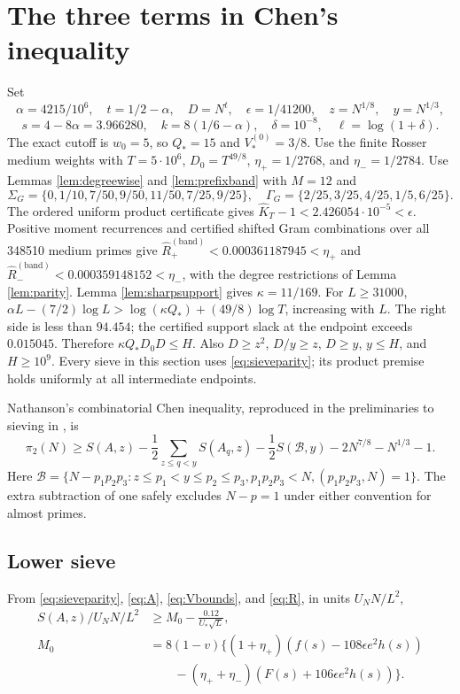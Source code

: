 \documentclass[11pt]{article}
\newcommand{\Th}{U_NN/L^2}
\begin{document}
\section{The three terms in Chen's inequality}
Set
\[
\alpha=4215/10^6,\quad t=1/2-\alpha,\quad D=N^t,\quad
\epsilon=1/41200,\quad z=N^{1/8},\quad y=N^{1/3},
\]
\[
s=4-8\alpha=3.966280,\quad k=8(1/6-\alpha),\quad
\delta=10^{-8},\quad \ell=\log(1+\delta).
\]
The exact cutoff is $w_0=5$, so $Q_*=15$ and
$V_*^{(0)}=3/8$. Use the finite Rosser medium weights with
$T=5\cdot10^6$, $D_0=T^{49/8}$,
$\eta_+=1/2768$, and $\eta_-=1/2784$.
Use Lemmas \ref{lem:degreewise} and \ref{lem:prefixband} with $M=12$ and
\[
\Sigma_G=\{0,1/10,7/50,9/50,11/50,7/25,9/25\},\quad
\Gamma_G=\{2/25,3/25,4/25,1/5,6/25\}.
\]
The ordered uniform product certificate gives
$\widehat K_T-1<2.426054\cdot10^{-5}<\epsilon$. Positive moment
recurrences and certified shifted Gram combinations over all 348510
medium primes give
$\widehat R^{(\mathrm{band})}_+<0.000361187945<\eta_+$ and
$\widehat R^{(\mathrm{band})}_-<0.000359148152<\eta_-$,
with the degree restrictions of Lemma \ref{lem:parity}.
Lemma \ref{lem:sharpsupport} gives $\kappa=11/169$.
For $L\ge31000$,
$\alpha L-(7/2)\log L>\log(\kappa Q_*)+(49/8)\log T$,
increasing with $L$. The right side is less than $94.454$;
the certified support slack at the endpoint exceeds $0.015045$.
Therefore $\kappa Q_*D_0D\le H$. Also $D\ge z^2$, $D/y\ge z$,
$D\ge y$, $y\le H$, and $H\ge10^9$.
Every sieve in this section uses \eqref{eq:sieveparity}; its
product premise holds uniformly at all intermediate endpoints.

Nathanson's combinatorial Chen inequality, reproduced in the
preliminaries to sieving in \cite{BS}, is
\begin{equation}\label{eq:Chen}
\pi_2(N)\ge S(A,z)-\frac12\sum_{z\le q<y}S(A_q,z)
-\frac12 S(\mathcal B,y)-2N^{7/8}-N^{1/3}-1.
\end{equation}
Here
$\mathcal B=\{N-p_1p_2p_3:z\le p_1<y\le p_2\le p_3,
p_1p_2p_3<N,(p_1p_2p_3,N)=1\}$.
The extra subtraction of one safely excludes $N-p=1$ under either
convention for almost primes.

\subsection{Lower sieve}
From \eqref{eq:sieveparity}, \eqref{eq:A}, \eqref{eq:Vbounds}, and
\eqref{eq:R}, in units $\Th$,
\begin{equation}\label{eq:low}
\begin{aligned}
S(A,z)/\Th&\ge M_0-\frac{0.12}{U_*\sqrt L},\\
M_0&=8(1-v)\bigl\{(1+\eta_+)(f(s)-108\epsilon e^2h(s))\\
&\qquad -(\eta_++\eta_-)(F(s)+106\epsilon e^2h(s))\bigr\}.
\end{aligned}
\end{equation}
\end{document}
